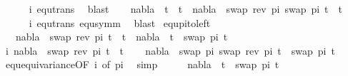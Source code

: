 \begin{isabellebody}
\ \ \ \ \isamarkupfalse%
\ i\ equ{\isacharunderscore}{\kern0pt}trans\ \isamarkupfalse%
\ blast\isanewline
\ \ \isamarkupfalse%
\ {\isachardoublequoteopen}nabla\ {\isasymturnstile}\ t{}\ {\isasymapprox}\ t{}\ {\isasymLongrightarrow}\ nabla\ {\isasymturnstile}\ swap\ {\isacharparenleft}{\kern0pt}rev\ pi{\isacharparenright}{\kern0pt}\ {\isacharparenleft}{\kern0pt}swap\ pi\ t{}{\isacharparenright}{\kern0pt}\ {\isasymapprox}\ t{}{\isachardoublequoteclose}\isanewline
\ \ \ \ \isamarkupfalse%
\ i\ equ{\isacharunderscore}{\kern0pt}trans\ equ{\isacharunderscore}{\kern0pt}symm\ \isamarkupfalse%
\ blast\isanewline
{}\isamarkupfalse%
%
\endisatagproof
{\isafoldproof}%
%
\isadelimproof
\isanewline
%
\endisadelimproof
\isanewline
{}\isamarkupfalse%
\ equ{\isacharunderscore}{\kern0pt}pi{\isacharunderscore}{\kern0pt}to{\isacharunderscore}{\kern0pt}left{\isacharcolon}{\kern0pt}\ \isanewline
\ \ \ {\isachardoublequoteopen}nabla\ {\isasymturnstile}\ swap\ {\isacharparenleft}{\kern0pt}rev\ pi{\isacharparenright}{\kern0pt}\ t{}\ {\isasymapprox}\ t{}\ {\isacharequal}{\kern0pt}\ nabla\ {\isasymturnstile}\ t{}\ {\isasymapprox}\ swap\ pi\ t{}{\isachardoublequoteclose}\isanewline
%
\isadelimproof
%
\endisadelimproof
%
\isatagproof
{}\isamarkupfalse%
\isanewline
\isanewline
\ \ \isakeywordONE{{\isacharbraceleft}{\kern0pt}}\isamarkupfalse%
\isamarkupfalse%
\ i{\isacharcolon}{\kern0pt}\ {\isachardoublequoteopen}nabla\ {\isasymturnstile}\ swap\ {\isacharparenleft}{\kern0pt}rev\ pi{\isacharparenright}{\kern0pt}\ t{}\ {\isasymapprox}\ t{}{\isachardoublequoteclose}\isanewline
\ \ \isamarkupfalse%
\ {\isachardoublequoteopen}nabla\ {\isasymturnstile}\ swap\ pi\ {\isacharparenleft}{\kern0pt}swap\ {\isacharparenleft}{\kern0pt}rev\ pi{\isacharparenright}{\kern0pt}\ t{}{\isacharparenright}{\kern0pt}\ {\isasymapprox}\ swap\ pi\ t{}{\isachardoublequoteclose}\isanewline
\ \ \ \ \isamarkupfalse%
\ equ{\isacharunderscore}{\kern0pt}equivariance{\isacharbrackleft}{\kern0pt}OF\ i{\isacharcomma}{\kern0pt}\ of\ pi{\isacharbrackright}{\kern0pt}\ \isamarkupfalse%
\ simp\isanewline
\ \ \isamarkupfalse%
\ \isamarkupfalse%
\ {\isachardoublequoteopen}nabla\ {\isasymturnstile}\ t{}\ {\isasymapprox}\ swap\ pi\ t{}{\isachardoublequoteclose}\isanewline

\end{isabellebody}
